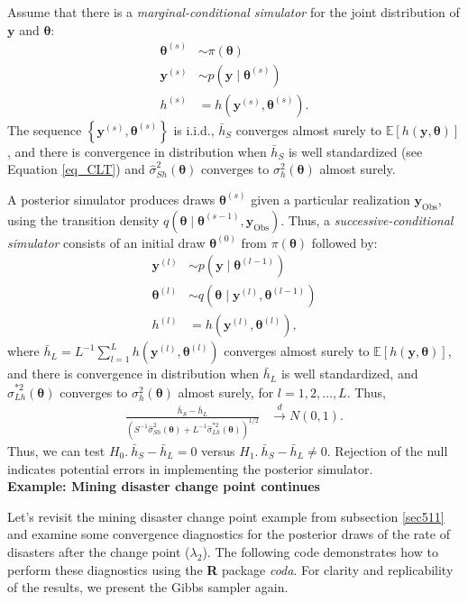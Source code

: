 Assume that there is a \textit{marginal-conditional simulator} for the joint distribution of $\bm{y}$ and $\bm{\theta}$:
\begin{align*}
	\bm{\theta}^{(s)} &\sim \pi(\bm{\theta})\\
	\bm{y}^{(s)} &\sim p(\bm{y}\mid \bm{\theta}^{(s)})\\
	h^{(s)} &= h(\bm{y}^{(s)},\bm{\theta}^{(s)}). 
\end{align*}
The sequence $\left\{\bm{y}^{(s)},\bm{\theta}^{(s)}\right\}$ is i.i.d., $\bar{h}_S$ converges almost surely to $\mathbb{E}[h(\bm{y},\bm{\theta})]$, and there is convergence in distribution when $\bar{h}_S$ is well standardized (see Equation \ref{eq_CLT}) and $\hat{\sigma}^2_{Sh}(\bm{\theta})$ converges to ${\sigma}^2_h(\bm{\theta})$ almost surely.

A posterior simulator produces draws $\bm{\theta}^{(s)}$ given a particular realization $\bm{y}_{\text{Obs}}$, using the transition density $q(\bm{\theta}\mid \bm{\theta}^{(s-1)},\bm{y}_{\text{Obs}})$. Thus, a \textit{successive-conditional simulator} consists of an initial draw $\bm{\theta}^{(0)}$ from $\pi(\bm{\theta})$ followed by:
\begin{align*}
	\bm{y}^{(l)} &\sim p(\bm{y}\mid \bm{\theta}^{(l-1)})\\
	\bm{\theta}^{(l)} &\sim q(\bm{\theta}\mid \bm{y}^{(l)},\bm{\theta}^{(l-1)})\\
	h^{(l)} &= h(\bm{y}^{(l)},\bm{\theta}^{(l)}), 
\end{align*}
where $\bar{h}_L=L^{-1}\sum_{l=1}^L h(\bm{y}^{(l)},\bm{\theta}^{(l)})$ converges almost surely to $\mathbb{E}[h(\bm{y},\bm{\theta})]$, and there is convergence in distribution when $\bar{h}_L$ is well standardized, and $\hat{\sigma}^{*2}_{Lh}(\bm{\theta})$ converges to ${\sigma}^2_h(\bm{\theta})$ almost surely, for $l=1,2,\dots,L$. Thus,
\begin{align*}
	\frac{\bar{h}_S-\bar{h}_L}{\left(S^{-1}\hat{\sigma}^2_{Sh}(\bm{\theta})+L^{-1}\hat{\sigma}^{*2}_{Lh}(\bm{\theta})\right)^{1/2}} &\stackrel{d}{\rightarrow} N(0,1).
\end{align*}
Thus, we can test $H_0. \ \bar{h}_S-\bar{h}_L=0$ versus $H_1. \ \bar{h}_S-\bar{h}_L\neq 0$. Rejection of the null indicates potential errors in implementing the posterior simulator.\\

\textbf{Example: Mining disaster change point continues}

Let's revisit the mining disaster change point example from subsection \ref{sec511} and examine some convergence diagnostics for the posterior draws of the rate of disasters after the change point ($\lambda_2$). The following code demonstrates how to perform these diagnostics using the \textbf{R} package \textit{coda}. For clarity and replicability of the results, we present the Gibbs sampler again.

